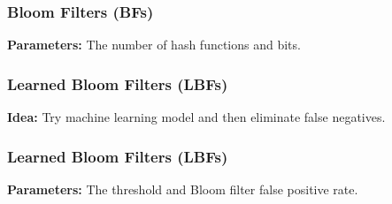 \documentclass{beamer}
\begin{document}

\begin{frame}
\frametitle{Bloom Filters (BFs) \cite{bloom_1970}}

\begin{center}
    

    \vspace{1em}

    \textbf{Parameters:} The number of hash functions and bits.
\end{center}

\end{frame}


\begin{frame}
\frametitle{Learned Bloom Filters (LBFs) \cite{kraska_beutel_chi_dean_polyzotis_2018}}


\begin{center}
    

    \vspace{1em}

    \textbf{Idea:} Try machine learning model and then eliminate false negatives.  
\end{center}

\end{frame}


\begin{frame}
\frametitle{Learned Bloom Filters (LBFs) \cite{kraska_beutel_chi_dean_polyzotis_2018}}


\begin{center}
    

    \vspace{1em}

    \textbf{Parameters:} The threshold and Bloom filter false positive rate.
\end{center}

\end{frame}

\end{document}
